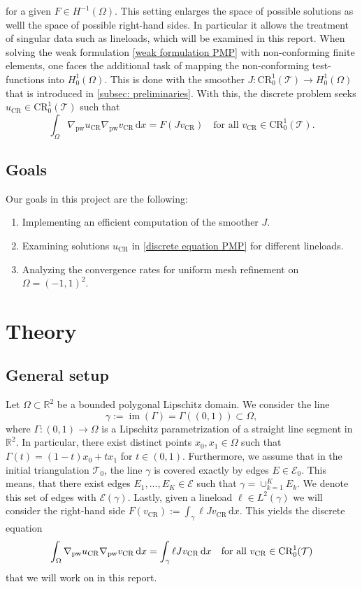 \documentclass[11pt,a4paper]{article}
\newcommand{\vCR}{v_{\mathrm{CR}}}
\newcommand{\uCR}{u_{\mathrm{CR}}}
\newcommand{\dx}{\,\mathrm{d}x}
\newcommand{\CR}{\mathrm{CR}^1_0(\mathcal{T})}
\begin{document}
for a given \(F \in H^{-1}(\Omega)\). This setting enlarges the space of possible solutions as welll the space of possible right-hand sides. In particular it allows the treatment of singular data such as lineloads, which will be examined in this report. When solving the weak formulation \eqref{weak formulation PMP} with non-conforming finite elements, one faces the additional task of mapping the non-conforming test-functions into \(H^1_0(\Omega)\). This is done with the smoother \(J: \CR \rightarrow H^1_0(\Omega)\) that is introduced in \ref{subsec: preliminaries}. With this, the discrete problem seeks \(\uCR \in \mathrm{CR}^1_0 (\mathcal{T})\) such that
\begin{equation} \label{discrete equation PMP}
\int_\Omega \nabla_\mathrm{pw} \uCR  \nabla_\mathrm{pw} \vCR \dx = F(J\vCR) \quad \text{for all } \vCR \in \CR.
\end{equation}
    
\subsection{Goals}
\label{goals}
Our goals in this project are the following:
\begin{enumerate}
    \item Implementing an efficient computation of the smoother \(J\).
    \item Examining solutions \(\uCR\) in \eqref{discrete equation PMP} for different lineloads.
    \item Analyzing the convergence rates for uniform mesh refinement on \(\Omega=(-1,1)^2\).
\end{enumerate}
\section{Theory}
\label{sec:theorie}
\subsection{General setup}
\label{general setup}
Let $\Omega \subset \mathbb{R}^2$ be a bounded polygonal Lipschitz domain.  
We consider the line \[
\gamma := \operatorname{im}(\Gamma) = \Gamma((0,1)) \subset \Omega,
\]
where
\(\Gamma : (0,1) \to \Omega\) is a Lipschitz parametrization of a straight line segment in $\mathbb{R}^2$. In particular, there exist distinct points $x_0, x_1 \in \Omega$ such that
\(\Gamma(t) = (1-t)x_0 + t x_1\) for \(t \in (0,1).\) Furthermore, we assume that in the initial triangulation \(\mathcal{T}_0\), the line \(\gamma\) is covered exactly by edges \(E \in \mathcal{E}_0\). This means, that there exist edges \(E_1, ...,E_K \in \mathcal{E}\) such that \(\gamma = \cup_{k=1}^K E_k\). We denote this set of edges with \(\mathcal{E}(\gamma)\).
Lastly, given a lineload \(\ell \in L^2(\gamma)\) we will consider the right-hand side \(F(\vCR) := \int_\gamma \ell J\vCR \dx\). This yields the discrete equation
\begin{equation} \label{discrete equation with lineload}
\int_\Omega \nabla_\mathrm{pw} \uCR  \nabla_\mathrm{pw} \vCR \dx = \int_\gamma \ell \space J\vCR \dx \quad \text{for all } \vCR \in \CR
\end{equation}
that we will work on in this report.
\end{document}
